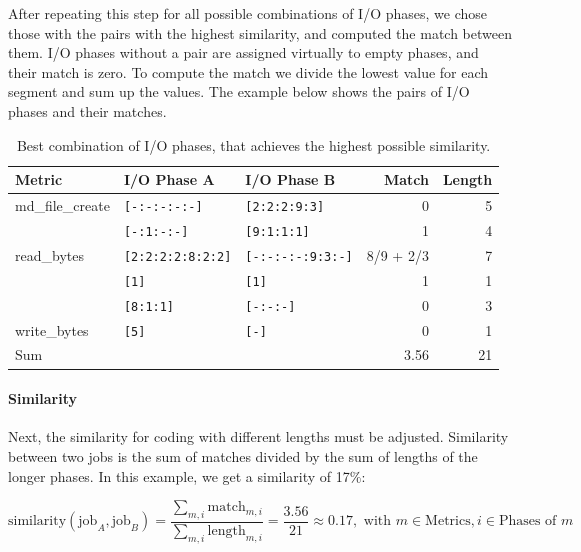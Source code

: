 \documentclass{jhps}
\begin{document}
After repeating this step for all possible combinations of I/O phases, we chose those with the pairs with the highest similarity, and computed the match between them.
I/O phases without a pair are assigned virtually to empty phases, and their match is zero.
To compute the match we divide the lowest value for each segment and sum up the values.
The example below shows the pairs of I/O phases and their matches.

\begin{table}
\centering
\begin{tabular}{lllrr}
	Metric           & I/O Phase A                 & I/O Phase B                 & Match     & Length \\
	\midrule
	md\_file\_create & \lstinline|[-:-:-:-:-]|     & \lstinline|[2:2:2:9:3]|     & 0         & 5      \\
	                 & \lstinline|[-:1:-:-]|       & \lstinline|[9:1:1:1]|       & 1         & 4      \\
	read\_bytes      & \lstinline|[2:2:2:2:8:2:2]| & \lstinline|[-:-:-:-:9:3:-]| & 8/9 + 2/3 & 7      \\
	                 & \lstinline|[1]|             & \lstinline|[1]|             & 1         & 1      \\
	                 & \lstinline|[8:1:1]|         & \lstinline|[-:-:-]|         & 0         & 3      \\
	write\_bytes     & \lstinline|[5]|             & \lstinline|[-]|             & 0         & 1      \\
	\midrule
	Sum              &                             &                             & 3.56      & 21     \\
\end{tabular}
\caption{Best combination of I/O phases, that achieves the highest possible similarity.}
\end{table}

\paragraph{Similarity}
Next, the similarity for coding with different lengths must be adjusted.
Similarity between two jobs is the sum of matches divided by the sum of lengths of the longer phases.
In this example, we get a similarity of 17$\%$:

\begin{equation}
	\text{similarity}(\text{job}_A, \text{job}_B) = \frac{\sum_{m,i}{\text{match}_{m,i}}}{\sum_{m,i}{\text{length}_{m,i}}} = \frac{3.56}{21} \approx 0.17, \text{ with } m \in \text{Metrics}, i \in \text{Phases of } m
\end{equation}
\end{document}
